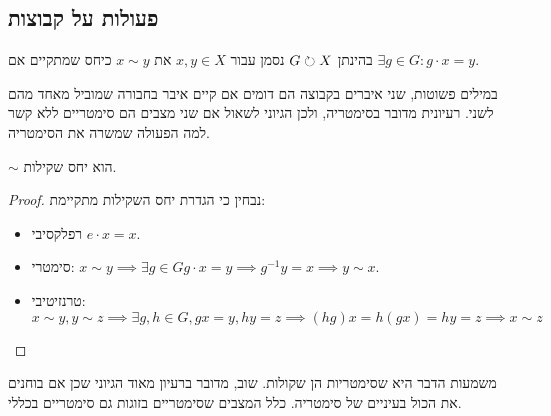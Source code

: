 \subsection{פעולות על קבוצות}
\begin{notation}
	בהינתן $G \circlearrowright X$ נסמן עבור $x, y \in X$ את $x \sim y$ כיחס שמתקיים אם $\exists g \in G : g \cdot x = y$.
\end{notation}
במילים פשוטות, שני איברים בקבוצה הם דומים אם קיים איבר בחבורה שמוביל מאחד מהם לשני. רעיונית מדובר בסימטריה, ולכן הגיוני לשאול אם שני מצבים הם סימטריים ללא קשר למה הפעולה שמשרה את הסימטריה.

\begin{proposition}
	$\sim$ הוא יחס שקילות.
\end{proposition}
\begin{proof}
	נבחין כי הגדרת יחס השקילות מתקיימת:
	\begin{itemize}
		\item רפלקסיבי $e \cdot x = x$.
		\item סימטרי: $x \sim y \implies \exists g \in G g \cdot x = y \implies g^{-1} y = x \implies y \sim x$.
		\item טרנזיטיבי: $x \sim y, y \sim z \implies \exists g, h \in G, gx = y, hy = z \implies (hg)x = h (gx) = hy = z \implies x \sim z$
	\end{itemize}
\end{proof}
משמעות הדבר היא שסימטריות הן שקולות. שוב, מדובר ברעיון מאוד הגיוני שכן אם בוחנים את הכול בעיניים של סימטריה. כלל המצבים שסימטריים בזוגות גם סימטריים בכללי.

